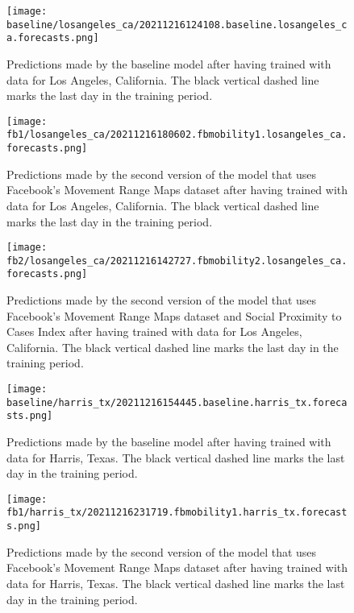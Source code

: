 \begin{figure}[!htb]
    \centering
    \texttt{[image: baseline/losangeles\_ca/20211216124108.baseline.losangeles\_ca.forecasts.png]}
    \caption{Predictions made by the baseline model after having trained with data for Los Angeles, California. The black vertical dashed line marks the last day in the training period.}
    \label{fig:predictions-losangeles-baseline}
\end{figure}

\begin{figure}[!htb]
    \centering
    \texttt{[image: fb1/losangeles\_ca/20211216180602.fbmobility1.losangeles\_ca.forecasts.png]}
    \caption{Predictions made by the second version of the model that uses Facebook's Movement Range Maps dataset after having trained with data for Los Angeles, California. The black vertical dashed line marks the last day in the training period.}
    \label{fig:predictions-losangeles-fb1}
\end{figure}

\begin{figure}[!htb]
    \centering
    \texttt{[image: fb2/losangeles\_ca/20211216142727.fbmobility2.losangeles\_ca.forecasts.png]}
    \caption{Predictions made by the second version of the model that uses Facebook's Movement Range Maps dataset and Social Proximity to Cases Index after having trained with data for Los Angeles, California. The black vertical dashed line marks the last day in the training period.}
    \label{fig:predictions-losangeles-fb2}
\end{figure}


\begin{figure}[!htb]
    \centering
    \texttt{[image: baseline/harris\_tx/20211216154445.baseline.harris\_tx.forecasts.png]}
    \caption{Predictions made by the baseline model after having trained with data for Harris, Texas. The black vertical dashed line marks the last day in the training period.}
    \label{fig:predictions-harris-baseline}
\end{figure}

\begin{figure}[!htb]
    \centering
    \texttt{[image: fb1/harris\_tx/20211216231719.fbmobility1.harris\_tx.forecasts.png]}
    \caption{Predictions made by the second version of the model that uses Facebook's Movement Range Maps dataset after having trained with data for Harris, Texas. The black vertical dashed line marks the last day in the training period.}
    \label{fig:predictions-harris-fb1}
\end{figure}

